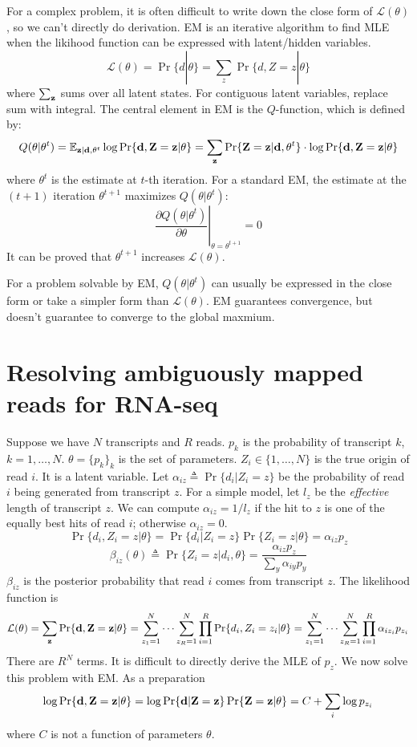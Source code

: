 \documentclass[10pt]{article}
\begin{document}
For a complex problem, it is often difficult to write down the close form of
$\mathcal{L}(\theta)$, so we can't directly do derivation. EM is an iterative
algorithm to find MLE when the likihood function can be expressed with
latent/hidden variables.
$$
\mathcal{L}(\theta)=\Pr\{d|\theta\}=\sum_z\Pr\{d,Z=z|\theta\}
$$
where $\sum_{\bf z}$ sums over all latent states. For contiguous latent
variables, replace sum with integral. The central element in EM is the
$Q$-function, which is defined by:
$$
Q(\theta|\theta^t)=\mathbb{E}_{{\bf z}|{\bf d},\theta^t}\log\Pr\{{\bf d},{\bf Z}={\bf z}|\theta\}=\sum_{{\bf z}}\Pr\{{\bf Z}={\bf z}|{\bf d},\theta^t\}\cdot\log\Pr\{{\bf d},{\bf Z}={\bf z}|\theta\}
$$
where $\theta^t$ is the estimate at $t$-th iteration. For a standard EM, the
estimate at the $(t+1)$ iteration $\theta^{t+1}$ maximizes $Q(\theta|\theta^t)$:
$$
\left.\frac{\partial Q(\theta|\theta^t)}{\partial\theta}\right|_{\theta=\theta^{t+1}}=0
$$
It can be proved that $\theta^{t+1}$ increases $\mathcal{L}(\theta)$.

For a problem solvable by EM, $Q(\theta|\theta^t)$ can usually be expressed in
the close form or take a simpler form than $\mathcal{L}(\theta)$. EM guarantees
convergence, but doesn't guarantee to converge to the global maxmium.

\section{Resolving ambiguously mapped reads for RNA-seq}

Suppose we have $N$ transcripts and $R$ reads. $p_k$ is the probability of
transcript $k$, $k=1,\ldots,N$. $\theta=\{p_k\}_k$ is the set of parameters.
$Z_i\in\{1,\ldots,N\}$ is the true origin of read $i$. It is a latent variable.
Let $\alpha_{iz}\triangleq\Pr\{d_i|Z_i=z\}$ be the probability of read $i$
being generated from transcript $z$. For a simple model, let $l_z$ be the
\emph{effective} length of transcript $z$. We can compute $\alpha_{iz}=1/l_z$
if the hit to $z$ is one of the equally best hits of read $i$; otherwise
$\alpha_{iz}=0$.
\[
\Pr\{d_i,Z_i=z|\theta\}=\Pr\{d_i|Z_i=z\}\Pr\{Z_i=z|\theta\}=\alpha_{iz}p_z
\]
\[
\beta_{iz}(\theta)\triangleq\Pr\{Z_i=z|d_i,\theta\}=\frac{\alpha_{iz}p_z}{\sum_{y}\alpha_{iy}p_y}
\]
$\beta_{iz}$ is the posterior probability that read $i$ comes from transcript
$z$. The likelihood function is
$$
\mathcal{L}(\theta)=\sum_{\bf z}\Pr\{{\bf d},{\bf Z}={\bf z}|\theta\}=\sum_{z_1=1}^N\cdots\sum_{z_R=1}^N\prod_{i=1}^R\Pr\{d_i,Z_i=z_i|\theta\}
=\sum_{z_1=1}^N\cdots\sum_{z_R=1}^N\prod_{i=1}^R\alpha_{iz_i}p_{z_i}
$$
There are $R^N$ terms. It is difficult to directly derive the MLE of $p_z$.
We now solve this problem with EM. As a preparation
\[
\log\Pr\{{\bf d},{\bf Z}={\bf z}|\theta\}=\log\Pr\{{\bf d}|{\bf Z}={\bf z}\}\Pr\{{\bf Z}={\bf z}|\theta\}=C+\sum_i\log p_{z_i}
\]
where $C$ is not a function of parameters $\theta$.
\end{document}
